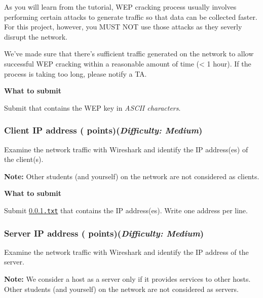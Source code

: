\smallskip

As you will learn from the tutorial, WEP cracking process usually involves performing certain attacks to generate traffic so that data can be collected faster.
For this project, however, you MUST NOT use those attacks as they severly disrupt the network.

\smallskip

We've made sure that there's sufficient traffic generated on the network to allow successful WEP cracking within a reasonable amount of time (< 1 hour).
If the process is taking too long, please notify a TA.

\smallskip

\hypertarget{cp2wep}{\textbf{What to submit}\hspace{10pt}}
Submit \texttt{\hyperlink{wepformat}{\filewep}} that contains the WEP key in \textit{ASCII characters}.

\subsubsection{Client IP address ( points)\hfill\rm\normalsize (\emph{Difficulty: Medium})}
\label{ssec:clientip}
\newcommand{\fileclientip}{\ref*{ssec:clientip}.txt}

Examine the network traffic with Wireshark and identify the IP address(es) of the client(s).

\textbf{Note:} Other students (and yourself) on the network are not considered as clients.

\smallskip

\hypertarget{cp2clientip}{\textbf{What to submit}\hspace{10pt}}
Submit \texttt{\hyperlink{clientipformat}{\fileclientip}} that contains the IP address(es).
Write one address per line.

\subsubsection{Server IP address ( points)\hfill\rm\normalsize (\emph{Difficulty: Medium})}
\label{ssec:serverip}
\newcommand{\fileserverip}{\ref*{ssec:serverip}.txt}

Examine the network traffic with Wireshark and identify the IP address of the server.

\textbf{Note:} We consider a host as a server only if it provides services to other hosts. Other students (and yourself) on the network are not considered as servers.

